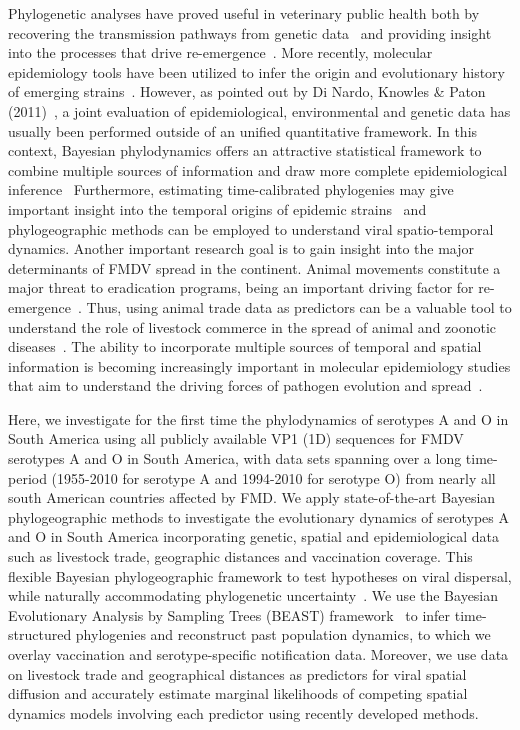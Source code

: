 \documentclass[10pt]{article}
\begin{document}
Phylogenetic analyses have proved useful in veterinary public health both by recovering the transmission pathways from genetic data~\cite{cottam2007, cottam2008} and providing insight into the processes that drive re-emergence~\cite{combining}.
More recently, molecular epidemiology tools have been utilized to infer the origin and evolutionary history of emerging strains~\cite{Perez2001, Malirat2007, andean, Malirat2011, Maradei2013}.
However, as pointed out by Di Nardo, Knowles \& Paton (2011)~\cite{combining}, a joint evaluation of epidemiological, environmental and genetic data has usually been performed outside of an unified quantitative framework.
In this context, Bayesian phylodynamics offers an attractive statistical framework to combine multiple sources of information and draw more complete epidemiological inference~\cite{grenfell, vphylodynamics}
Furthermore, estimating time-calibrated phylogenies may give important insight into the temporal origins of epidemic strains~\cite{grenfell, vphylodynamics} and phylogeographic methods can be employed to understand viral spatio-temporal dynamics.
Another important research goal is to gain insight into the major determinants of FMDV spread in the continent.
Animal movements constitute a major threat to eradication programs, being an important driving factor for re-emergence~\cite{movements}.
Thus, using animal trade data as predictors can be a valuable tool to understand the role of livestock commerce in the spread of animal and zoonotic diseases~\cite{Nelson2011}.
The ability to incorporate multiple sources of temporal and spatial information is becoming increasingly important in molecular epidemiology studies that aim to understand the driving forces of pathogen evolution and spread~\cite{towards, combining, MEP, roots}.

Here, we investigate for the first time the phylodynamics of serotypes A and O in South America using all publicly available VP1 (1D) sequences for FMDV serotypes A and O in South America, with data sets spanning over a long time-period (1955-2010 for serotype A and 1994-2010 for serotype O) from nearly all south American countries affected by FMD.
We apply state-of-the-art Bayesian phylogeographic methods to investigate the evolutionary dynamics of serotypes A and O in South America incorporating  genetic, spatial and epidemiological data such as livestock trade, geographic distances and vaccination coverage.
This flexible Bayesian phylogeographic framework to test hypotheses on viral dispersal, while naturally accommodating phylogenetic uncertainty~\cite{roots, towards}.
We use the Bayesian Evolutionary Analysis by Sampling Trees (BEAST) framework~\cite{beast2012} to infer time-structured phylogenies and reconstruct past population dynamics, to which we overlay vaccination and serotype-specific notification data.
Moreover, we use data on livestock trade and geographical distances as predictors for viral spatial diffusion and accurately estimate marginal likelihoods of competing spatial dynamics models involving each predictor using recently developed methods.
\end{document}

